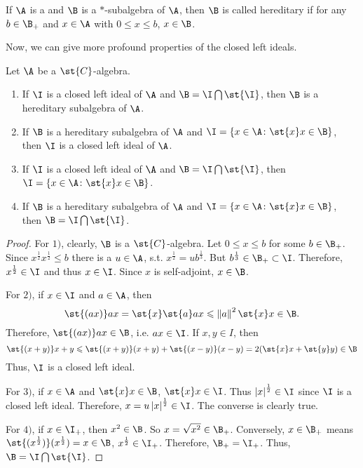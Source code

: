 \begin{defn}
	If $\A$ is a \Cs and $\B$ is a $*$-subalgebra of $\A$, then $\B$ is called hereditary if for any $b \in \B_{+}$ and $x \in \A$ with $0 \leqslant x \leqslant b$, $x \in \B$.
\end{defn}

Now, we can give more profound properties of the closed left ideals.

\begin{thm} \label{thm6}
	Let $\A$ be a $\st{C}$-algebra.
	\begin{enumerate}[label=\arabic*)]
		\item If $\I$ is a closed left ideal of $\A$ and $\B = \I \bigcap \st{\I}$, then $\B$ is a hereditary subalgebra of $\A$.
		\item If $\B$ is a hereditary subalgebra of $\A$ and $\I = \{x\in \A \colon \st{x}x \in \B\}$, then $\I$ is a closed left ideal of $\A$.
		\item If $\I$ is a closed left ideal of $\A$ and $\B = \I \bigcap \st{\I}$, then $\I = \{x\in \A \colon \st{x}x \in \B\}$.
		\item If $\B$ is a hereditary subalgebra of $\A$ and $\I = \{x\in \A \colon \st{x}x \in \B\}$, then $\B = \I \bigcap \st{\I}$.
	\end{enumerate}
\end{thm}
\begin{proof}
	For $1)$, clearly, $\B$ is a $\st{C}$-algebra. Let $0 \leqslant x \leqslant b$ for some $b \in \B_{+}$. Since $x^{\frac{1}{2}}x^{\frac{1}{2}} \leqslant b$ there is a $u \in \A$, s.t. $x^{\frac{1}{2}} = u b^{\frac{1}{3}}$. But $b^{\frac{1}{3}} \in \B_{+} \subset \I$. Therefore, $x^{\frac{1}{2}} \in \I$ and thus $x \in \I$. Since $x$ is self-adjoint, $x \in \B$.
	\item For $2)$, if $x \in \I$ and $a \in \A$, then 
	\begin{equation*}
		\st{(ax)}ax = \st{x}\st{a}ax \leqslant \norm{a}^2 \st{x}x \in \B.
	\end{equation*}
	Therefore, $\st{(ax)}ax \in \B$, i.e. $ax \in \I$. If $x,y \in I$, then 
	\begin{equation*}
		\st{(x+y)}x+y \leqslant \st{(x+y)}(x+y)+\st{(x-y)}(x-y) = 2 (\st{x}x+\st{y}y) \in \B
	\end{equation*}
	Thus, $\I$ is a closed left ideal.
	\item For $3)$, if $x \in \A$ and $\st{x}x \in \B$, $\st{x}x \in \I$. Thus $\abs{x}^{\frac{1}{2}} \in \I$ since $\I$ is a closed left ideal. Therefore, $x = u \abs{x}^{\frac{1}{2}} \in \I$. The converse is clearly true.
	\item For $4)$, if $x \in \I_{+}$, then $x^2 \in \B$. So $x = \sqrt{x^2} \in \B_{+}$. Conversely, $x \in \B_{+}$ means $\st{(x^{\frac{1}{2}})}(x^{\frac{1}{2}}) = x \in \B$, $x^{\frac{1}{2}} \in \I_{+}$. Therefore, $\B_{+} = \I_{+}$. Thus, $\B = \I \bigcap \st{\I}$. 
\end{proof}

